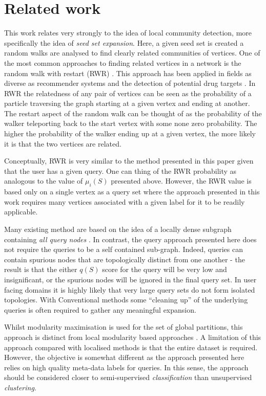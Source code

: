 \documentclass[a4paper,10pt]{article}
\begin{document}
\section{Related work}
\label{sec:related_work}

This work relates very strongly to the idea of local community detection, more specifically the idea of \textit{seed set expansion}.
Here, a given seed set is created a random walks are analysed to find clearly related communities of vertices.
One of the most common approaches to finding related vertices in a network is the random walk with restart (RWR) \cite{can2005analysis, kohler2008walking}.
This approach has been applied in fields as diverse as recommender systems and the detection of potential drug targets \cite{chen2012drug}.
In RWR the relatedness of any pair of vertices can be seen as the probability of a particle traversing the graph starting at a given vertex and ending at another.
The restart aspect of the random walk can be thought of as the probability of the walker teleporting back to the start vertex with some none zero probability. 
The higher the probability of the walker ending up at a given vertex, the more likely it is that the two vertices are related.

Conceptually, RWR is very similar to the method presented in this paper given that the user has a given query.
One can thing of the RWR probability as analogous to the value of $\mu_i(S)$ presented above.
However, the RWR value is based only on a single vertex as a query set where the approach presented in this work requires many vertices associated with a given label for it to be readily applicable.


Many existing method are based on the idea of a locally dense subgraph containing \textit{all query nodes} \cite{}.
In contrast, the query approach presented here does not require the queries to be a self contained sub-graph.
Indeed, queries can contain spurious nodes that are topologically distinct from one another - the result is that the either $q(S)$ score for the query will be very low and insignificant, or the spurious nodes will be ignored in the final query set.
In user facing domains it is highly likely that very large query sets do not form isolated topologies.
With Conventional methods some ``cleaning up'' of the underlying queries is often required to gather any meaningful expansion.

Whilst modularity maximisation is used for the set of global partitions, this approach is distinct from local modularity based approaches \cite{}.
A limitation of this approach compared with localised methods is that the entire dataset is required.
However, the objective is somewhat different as the approach presented here relies on high quality meta-data labels for queries.
In this sense, the approach should be considered closer to semi-supervised \textit{classification} than unsupervised \textit{clustering}.
\end{document}
